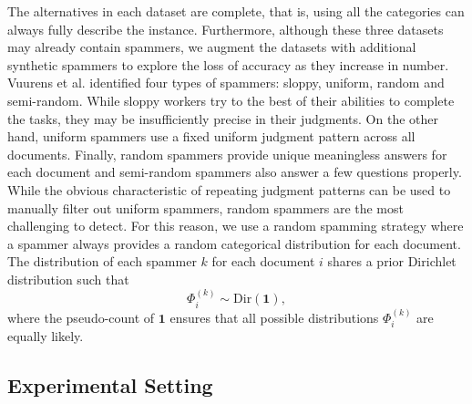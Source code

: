 \documentclass{article}
\begin{document}
\textbf{} The alternatives in each dataset are complete, that
is, using all the categories can always fully describe the instance.
Furthermore, although these three datasets may already contain spammers,
we augment the datasets with additional synthetic spammers to explore
the loss of accuracy as they increase in number. Vuurens et al. \cite{vuurens_how_2011}
identified four types of spammers: sloppy, uniform, random and semi-random.
While sloppy workers try to the best of their abilities to complete
the tasks, they may be insufficiently precise in their judgments.
On the other hand, uniform spammers use a fixed uniform judgment pattern
across all documents. Finally, random spammers provide unique meaningless
answers for each document and semi-random spammers also answer a
few questions properly. While the obvious characteristic of repeating
judgment patterns can be used to manually filter out uniform spammers,
random spammers are the most challenging to detect. For this reason,
we use a random spamming strategy where a spammer always provides
a random categorical distribution for each document. The distribution
of each spammer $k$ for each document $i$ shares a prior Dirichlet
distribution such that
\begin{equation}
\Phi_{i}^{(k)}\sim\mbox{Dir}\left(\mathbf{1}\right),\label{eq:spammer-prior}
\end{equation}
where the pseudo-count of $\mathbf{1}$ ensures that all possible
distributions $\Phi_{i}^{(k)}$ are equally likely.


\subsection{Experimental Setting}

\label{sub:4.2-Experimental-Setting}
\end{document}
